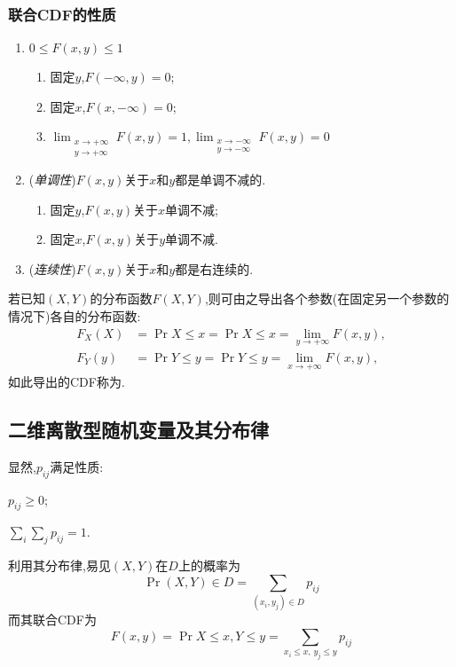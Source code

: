 \subsubsection{联合CDF的性质}
\begin{enumerate}
    \item $0\leq F(x,y )\leq 1$
          \begin{enumerate}
              \item 固定$y$,$F(-\infty,y ) = 0$;
              \item 固定$x$,$F(x,-\infty) = 0$;
              \item $\lim_{\substack{x\to +\infty\\y\to +\infty}}F(x,y ) = 1, \lim_{\substack{x\to -\infty\\y\to -\infty}}F(x,y) = 0$
          \end{enumerate}
    \item (\textit{单调性})$F(x,y )$关于$x$和$y$都是单调不减的.
          \begin{enumerate}
              \item 固定$y$,$F(x,y )$关于$x$单调不减;
              \item 固定$x$,$F(x,y )$关于$y$单调不减.
          \end{enumerate}
    \item (\textit{连续性})$F(x,y )$关于$x$和$y$都是右连续的.
\end{enumerate}
若已知$(X,Y)$的分布函数$F(X,Y)$,则可由之导出各个参数(在固定另一个参数的情况下)各自的分布函数:
\begin{align}
    F_X(X) & = \Pr{X\leq x } =\Pr{X\leq x} = \lim_{y\to +\infty}F(x,y), \\
    F_Y(y) & = \Pr{Y\leq y } =\Pr{Y\leq y} = \lim_{x\to +\infty}F(x,y),
\end{align}
如此导出的CDF称为.
\subsection{二维离散型随机变量及其分布律}
显然,$p_{ij}$满足性质:\;\;
\begin{enumerate*}
    \item $p_{ij}\geq 0$;
          \quad\item $\sum_i\sum_j p_{ij} = 1$.
\end{enumerate*}
利用其分布律,易见$(X,Y )$在$D$上的概率为
\begin{equation}
    \Pr{(X,Y)\in D} = \sum_{(x_i,y_j)\in D}p_{ij}
\end{equation}
而其联合CDF为
\begin{equation}
    F(x,y) = \Pr{X\leq x, Y\leq y } = \sum_{x_i\leq x,\,y_j\leq y}p_{ij}
\end{equation}

